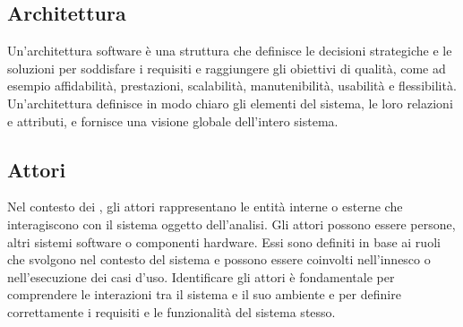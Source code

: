 \vspace{2em}
\subsection*{Architettura}
Un'architettura software è una struttura che definisce le decisioni strategiche e le soluzioni per soddisfare i requisiti e raggiungere gli obiettivi di qualità, come ad esempio affidabilità, prestazioni, scalabilità, manutenibilità, usabilità e flessibilità. Un'architettura definisce in modo chiaro gli elementi del sistema, le loro relazioni e attributi, e fornisce una visione globale dell'intero sistema.

\vspace{2em}
\subsection*{Attori}
Nel contesto dei , gli attori rappresentano le entità interne o esterne che interagiscono con il sistema oggetto dell'analisi. Gli attori possono essere persone, altri sistemi software o componenti hardware. Essi sono definiti in base ai ruoli che svolgono nel contesto del sistema e possono essere coinvolti nell'innesco o nell'esecuzione dei casi d'uso. Identificare gli attori è fondamentale per comprendere le interazioni tra il sistema e il suo ambiente e per definire correttamente i requisiti e le funzionalità del sistema stesso.
